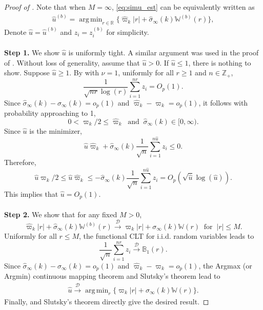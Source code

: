 \documentclass[11pt]{article}
\DeclareMathOperator*{\argmin}{arg\,min}
\theoremstyle{plain}
\theoremstyle{definition}
\begin{document}
\begin{proof}[Proof of ]
Note that when $M = \infty$, \eqref{eq:simu_est} can be equivalently written as   
        \begin{align*}
            \widehat{u}^{(b)} = \argmin_{r \in \mathbb{R}} \big\{\widehat{\varpi}_k|r| + \widehat{\sigma}_{\infty}(k)\mathbb{W}^{(b)}(r)\big\},
        \end{align*}
Denote $\widehat u =  \widehat u^{(b)} $ and $z_i = z_i^{(b)}$ for simplicity.  
\\
\\
{\bf Step 1.}  We show $\widehat u$ is uniformly tight.  A similar argument was  used in  the proof of . 
Without loss of generality, assume that 
$\widehat u >0$. If $\widehat u  \le 1 $, there is nothing to show. 
Suppose $\widehat u\ge 1$. 
 By   with $\nu = 1$, uniformly for all $r\ge 1 $ and $n \in \mathbb Z_+ $,
$$    \frac{1}{\sqrt { nr }  \log ( r )    }\sum_{i=1}^{nr } z_i      =O_p(1) .  $$
Since 
$\widehat \sigma_{\infty}(k) - \sigma_{\infty}(k) =o_p(1   ) $ and 
 $\widehat \varpi_k - \varpi_k =o_p(1 ) $, it follows with probability approaching to 1, $$ 0< \varpi_k/2 \le \widehat \varpi_k \;\; \text{and} \;\;  \widehat \sigma_{\infty}(k) \in [0, \infty).  $$
Since $\widehat u$ is the minimizer, 
$$ \widehat u  \widehat \varpi_k  + \widehat \sigma_{\infty}(k) \frac{1}{\sqrt { n   } } \sum_{i=1}^{n \widehat u   } z_i \le 0  . $$ 
Therefore,
$$ \widehat u   \varpi_k /2  \le \widehat u  \widehat \varpi_k  \le  - \widehat \sigma_{\infty}(k) \frac{1}{\sqrt { n   } } \sum_{i=1}^{n \widehat u   } z_i    = O_p( \sqrt { \widehat u}    \log(\widehat u ) ).$$
This implies that $\widehat u =O_p(1). $
\\
\\
{\bf Step 2.} We show that for any fixed $M>0$,   
$$\widehat{\varpi}_k|r| + \widehat{\sigma}_{\infty}(k)\mathbb{W}^{(b)}(r) \overset{\mathcal{D}} {\longrightarrow}  \varpi_k|r| + \sigma_{\infty}(k)\mathbb{W}(r) \;\; \text{for} \;\; |r| \le M  .$$  
Uniformly for all $r\le M$, the functional CLT for i.i.d. random variables leads to
$$  \frac{1}{\sqrt { n   } } \sum_{i=1}^{nr  } z_i \overset{\mathcal{D}}{\longrightarrow } \mathbb B_1(r) .$$
Since 
$\widehat \sigma_{\infty}(k) - \sigma_{\infty}(k) =o_p(1   ) $ and 
 $\widehat \varpi_k - \varpi_k =o_p(1 ) $, the Argmax (or Argmin) continuous mapping theorem and Slutsky's theorem lead to
    \begin{align*}
        \widehat{u} \overset{\mathcal{D}}{\longrightarrow} \argmin_r \big\{\varpi_k|r| + \sigma_{\infty}(k)\mathbb{W}(r)\big\}.
    \end{align*}
Finally,  and Slutsky's theorem directly give the desired result.
\end{proof}
\end{document}
